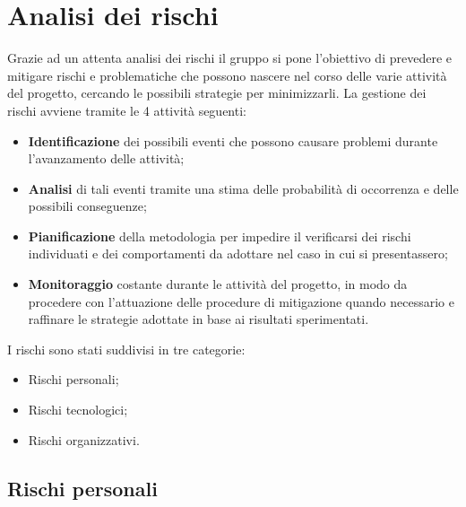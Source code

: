 \section{Analisi dei rischi}

Grazie ad un attenta analisi dei rischi il gruppo si pone l'obiettivo di prevedere e mitigare rischi e problematiche che possono nascere nel corso delle varie attività del progetto, cercando le possibili strategie per minimizzarli. 
La gestione dei rischi avviene tramite le 4 attività seguenti:
\begin{itemize}
	\item \textbf{Identificazione} dei possibili eventi che possono causare problemi durante l'avanzamento delle attività;
	\item \textbf{Analisi} di tali eventi tramite una stima delle probabilità di occorrenza e delle possibili conseguenze;
	\item \textbf{Pianificazione} della metodologia per impedire il verificarsi dei rischi individuati e dei comportamenti da adottare nel caso in cui si presentassero;
	\item \textbf{Monitoraggio} costante durante le attività del progetto, in modo da procedere con l'attuazione delle procedure di mitigazione quando necessario e raffinare le strategie adottate in base ai risultati sperimentati.
	
\end{itemize}

I rischi sono stati suddivisi in tre categorie:
\begin{itemize}
	\item Rischi personali;
	\item Rischi tecnologici;
	\item Rischi organizzativi.
\end{itemize}

\newpage
\subsection{Rischi personali}

